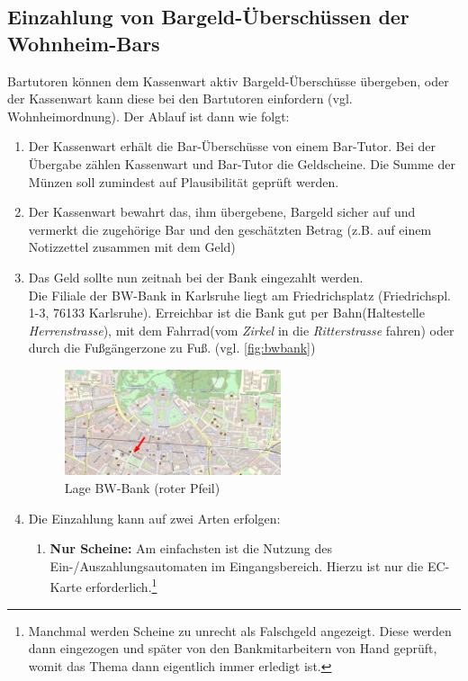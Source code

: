 \documentclass[10pt,a4paper,noendnumber=true]{scrartcl}
\begin{document}
\subsection{Einzahlung von Bargeld-Überschüssen der Wohnheim-Bars}
Bartutoren können dem Kassenwart aktiv Bargeld-Überschüsse übergeben, oder der Kassenwart kann diese bei den Bartutoren einfordern (vgl. Wohnheimordnung). Der Ablauf ist dann wie folgt:
\begin{enumerate}
	\item Der Kassenwart erhält die Bar-Überschüsse von einem Bar-Tutor. Bei der Übergabe zählen Kassenwart und Bar-Tutor die Geldscheine. Die Summe der Münzen soll zumindest auf Plausibilität geprüft werden.
	
	\item Der Kassenwart bewahrt das, ihm übergebene, Bargeld sicher auf und vermerkt die zugehörige Bar und den geschätzten Betrag (z.B. auf einem Notizzettel zusammen mit dem Geld)
	
	\item Das Geld sollte nun zeitnah bei der Bank eingezahlt werden.\\
	Die Filiale der BW-Bank in Karlsruhe liegt am Friedrichsplatz (Friedrichspl. 1-3, 76133 Karlsruhe). Erreichbar ist die Bank gut per Bahn(Haltestelle \textit{Herrenstrasse}), mit dem Fahrrad(vom \textit{Zirkel} in die \textit{Ritterstrasse} fahren) oder durch die Fußgängerzone zu Fuß. (vgl. \autoref{fig:bwbank})
	\begin{figure}[H]
		\centering\includegraphics[width=0.6\textwidth]{img/kassenwart/bwbank.png}
		\caption{Lage BW-Bank (roter Pfeil)}\label{fig:bwbank}
	\end{figure}

	\item Die Einzahlung kann auf zwei Arten erfolgen:
	\begin{enumerate}
		\item \textbf{Nur Scheine:} Am einfachsten ist die Nutzung des Ein-/Auszahlungsautomaten im Eingangsbereich. Hierzu ist nur die EC-Karte erforderlich.\footnote{Manchmal werden Scheine zu unrecht als Falschgeld angezeigt. Diese werden dann eingezogen und später von den Bankmitarbeitern von Hand geprüft, womit das Thema dann eigentlich immer erledigt ist.}
		

\end{enumerate}
\end{enumerate}
\end{document}
